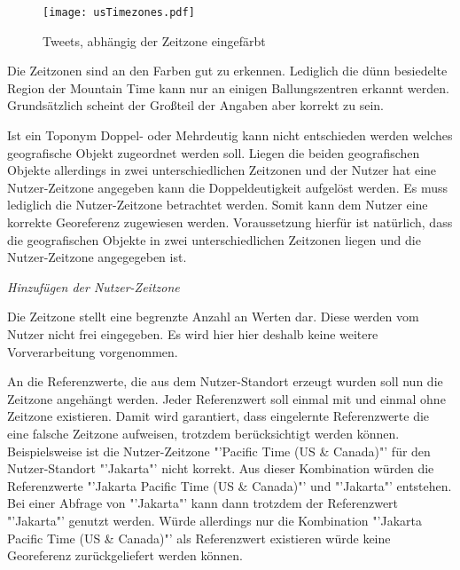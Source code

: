 					 \begin{figure}[!ht]
						\begin{center}
							\texttt{[image: usTimezones.pdf]}
							\caption{Tweets, abhängig der Zeitzone eingefärbt}
							\label{img:usTimezones}
						\end{center}
					\end{figure}	

					 Die Zeitzonen sind an den Farben gut zu erkennen. 
					 Lediglich die dünn besiedelte Region der Mountain Time kann nur an einigen Ballungszentren erkannt werden. 
					 Grundsätzlich scheint der Großteil der Angaben aber korrekt zu sein.

					Ist ein Toponym Doppel- oder Mehrdeutig kann nicht entschieden werden welches geografische Objekt zugeordnet werden soll.
					Liegen die beiden geografischen Objekte allerdings in zwei unterschiedlichen Zeitzonen und der Nutzer hat eine Nutzer-Zeitzone angegeben kann die Doppeldeutigkeit aufgelöst werden.
					Es muss lediglich die Nutzer-Zeitzone betrachtet werden.
					Somit kann dem Nutzer eine korrekte Georeferenz zugewiesen werden.
					Voraussetzung hierfür ist natürlich, dass die geografischen Objekte in zwei unterschiedlichen Zeitzonen liegen und die Nutzer-Zeitzone angegegeben ist.

				\textit{Hinzufügen der Nutzer-Zeitzone}

					Die Zeitzone stellt eine begrenzte Anzahl an Werten dar.
					Diese werden vom Nutzer nicht frei eingegeben. 
					Es wird hier hier deshalb keine weitere Vorverarbeitung vorgenommen.

					An die Referenzwerte, die aus dem Nutzer-Standort erzeugt wurden soll nun die Zeitzone angehängt werden.
					Jeder Referenzwert soll einmal mit und einmal ohne Zeitzone existieren. 
					Damit wird garantiert, dass eingelernte Referenzwerte die eine falsche Zeitzone aufweisen, trotzdem berücksichtigt werden können. 
					Beispielsweise ist die Nutzer-Zeitzone "'Pacific Time (US \& Canada)"' für den Nutzer-Standort "'Jakarta"' nicht korrekt.
					Aus dieser Kombination würden die Referenzwerte "'Jakarta Pacific Time (US \& Canada)"' und "'Jakarta"' entstehen. 
					Bei einer Abfrage von "'Jakarta"' kann dann trotzdem der Referenzwert "'Jakarta"' genutzt werden. 
					Würde allerdings nur die Kombination "'Jakarta Pacific Time (US \& Canada)"' als Referenzwert existieren würde keine Georeferenz zurückgeliefert werden können.

